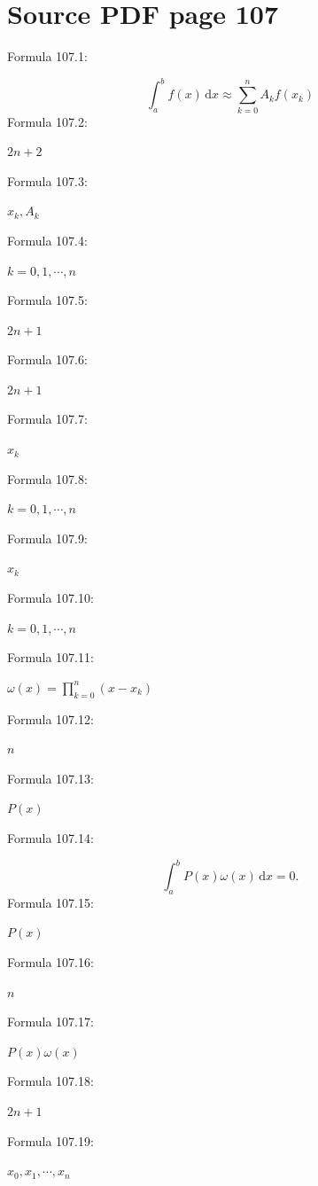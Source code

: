 \documentclass[11pt]{article}
\begin{document}
\section*{Source PDF page 107}
\noindent Formula 107.1:\par
\[
\int_a^b f(x)\,\mathrm{d}x\approx\sum_{k=0}^{n}A_kf(x_k)
\tag{4.4.1}
\]
\noindent Formula 107.2:\par
$2n+2$\par
\noindent Formula 107.3:\par
$x_k,A_k$\par
\noindent Formula 107.4:\par
$k=0,1,\cdots,n$\par
\noindent Formula 107.5:\par
$2n+1$\par
\noindent Formula 107.6:\par
$2n+1$\par
\noindent Formula 107.7:\par
$x_k$\par
\noindent Formula 107.8:\par
$k=0,1,\cdots,n$\par
\noindent Formula 107.9:\par
$x_k$\par
\noindent Formula 107.10:\par
$k=0,1,\cdots,n$\par
\noindent Formula 107.11:\par
$\displaystyle\omega(x)=\prod_{k=0}^{n}(x-x_k)$\par
\noindent Formula 107.12:\par
$n$\par
\noindent Formula 107.13:\par
$P(x)$\par
\noindent Formula 107.14:\par
\[
\int_a^b P(x)\omega(x)\,\mathrm{d}x=0.
\tag{4.4.2}
\]
\noindent Formula 107.15:\par
$P(x)$\par
\noindent Formula 107.16:\par
$n$\par
\noindent Formula 107.17:\par
$P(x)\omega(x)$\par
\noindent Formula 107.18:\par
$2n+1$\par
\noindent Formula 107.19:\par
$x_0,x_1,\cdots,x_n$\par
\end{document}
